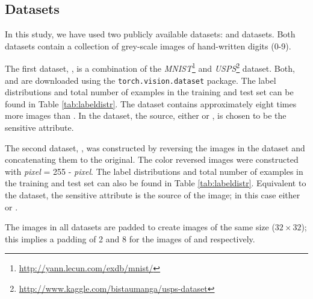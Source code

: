 


\subsection{Datasets}

In this study, we have used two publicly available datasets:  \revMNIST and \USPSMNIST datasets. Both datasets contain a collection of grey-scale images of hand-written digits (0-9). 

The first dataset, \USPSMNIST, is a combination of the \textit{MNIST}\footnote{\url{http://yann.lecun.com/exdb/mnist/}} and \textit{USPS}\footnote{\url{http://www.kaggle.com/bistaumanga/usps-dataset}} dataset. Both, \mn and \usps are downloaded using the \texttt{torch.vision.dataset} package. The label distributions and total number of examples in the training and test set can be found in Table \ref{tab:labeldistr}. The \mn dataset contains approximately eight times more images than \usps. In the \USPSMNIST dataset, the source, either \mn or \usps, is chosen to be the sensitive attribute. 

The second dataset, \revMNIST, was constructed by reversing the images in the \mn dataset and concatenating them to the original. The color reversed images were constructed with \textit{pixel} = 255 - \textit{pixel}. The label distributions and total number of examples in the training and test set can also be found in Table \ref{tab:labeldistr}. Equivalent to the \USPSMNIST dataset, the sensitive attribute is the source of the image; in this case either \mn or \rmn.

The images in all datasets are padded to create images of the same size ($32\times 32$); this implies a padding of 2 and 8 for the images of \mn and \usps respectively.


